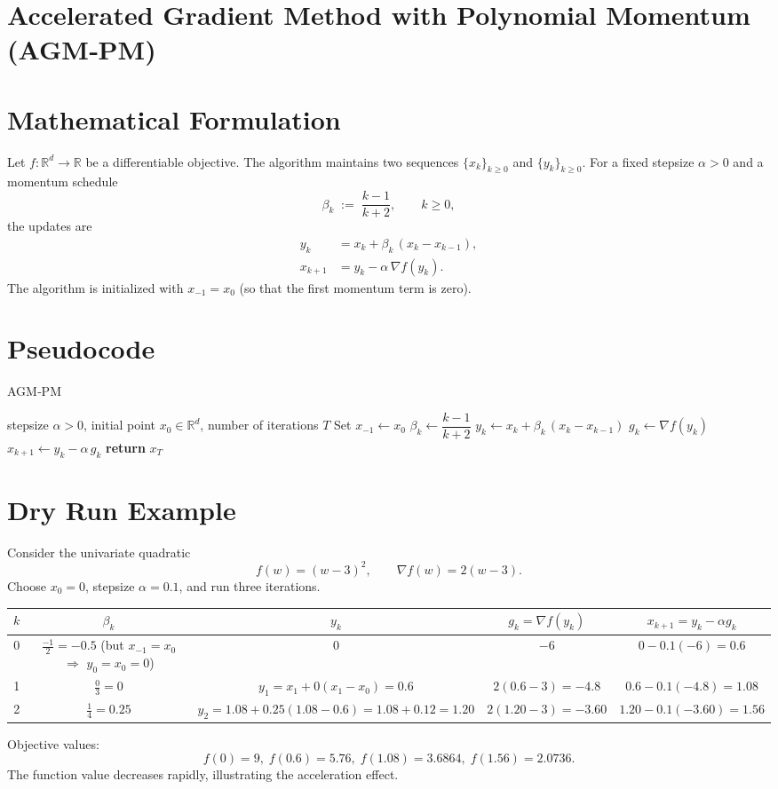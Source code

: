 \documentclass[11pt]{article}
\newcommand{\R}{\mathbb{R}}
\begin{document}
\section*{Accelerated Gradient Method with Polynomial Momentum (AGM‑PM)}

\section*{Mathematical Formulation}
Let $f:\R^{d}\to\R$ be a differentiable objective.  
The algorithm maintains two sequences $\{x_k\}_{k\ge 0}$ and $\{y_k\}_{k\ge 0}$.
For a fixed stepsize $\alpha>0$ and a momentum schedule
\[
\beta_k \;:=\; \frac{k-1}{k+2},\qquad k\ge 0,
\]
the updates are
\begin{align}
y_k &= x_k + \beta_k\,(x_k-x_{k-1}), \tag{1}\\
x_{k+1} &= y_k - \alpha\,\nabla f(y_k). \tag{2}
\end{align}
The algorithm is initialized with $x_{-1}=x_0$ (so that the first momentum term is zero).

\section*{Pseudocode}
\begin{algorithm}[H]
\caption{AGM‑PM}
\begin{algorithmic}[1]
\Require stepsize $\alpha>0$, initial point $x_{0}\in\R^{d}$, number of iterations $T$
\State Set $x_{-1}\gets x_{0}$
    \State $\beta_k \gets \dfrac{k-1}{k+2}$ 
    \State $y_k \gets x_k + \beta_k\,(x_k - x_{k-1})$ 
    \State $g_k \gets \nabla f(y_k)$
    \State $x_{k+1} \gets y_k - \alpha\, g_k$ 
\EndFor
\State \textbf{return} $x_T$
\end{algorithmic}
\end{algorithm}

\section*{Dry Run Example}
Consider the univariate quadratic
\[
f(w) = (w-3)^2,\qquad \nabla f(w)=2(w-3).
\]
Choose $x_0=0$, stepsize $\alpha=0.1$, and run three iterations.

\begin{center}
\begin{tabular}{c|c|c|c|c}
$k$ & $\beta_k$ & $y_k$ & $g_k=\nabla f(y_k)$ & $x_{k+1}=y_k-\alpha g_k$ \\ \hline
0 & $\displaystyle\frac{-1}{2}= -0.5$ (but $x_{-1}=x_0$ $\Rightarrow$ $y_0=x_0=0$) & $0$ & $-6$ & $0-0.1(-6)=0.6$ \\ \hline
1 & $\displaystyle\frac{0}{3}=0$ & $y_1 = x_1 +0(x_1-x_0)=0.6$ & $2(0.6-3)=-4.8$ & $0.6-0.1(-4.8)=1.08$ \\ \hline
2 & $\displaystyle\frac{1}{4}=0.25$ & $y_2 = 1.08+0.25(1.08-0.6)=1.08+0.12=1.20$ & $2(1.20-3)=-3.60$ & $1.20-0.1(-3.60)=1.56$
\end{tabular}
\end{center}
Objective values:
\[
f(0)=9,\; f(0.6)=5.76,\; f(1.08)=3.6864,\; f(1.56)=2.0736.
\]
The function value decreases rapidly, illustrating the acceleration effect.
\end{document}
